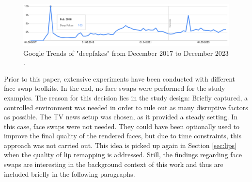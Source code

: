 \documentclass[
  a4paper,  %
  twoside,  %
  bibliography=totoc,
  headsepline,
  cleardoublepage=empty,
  parskip=half,
  draft=false
]{scrbook}
\begin{document}
\begin{figure}[h]
  \centering
  \includegraphics[width=1\textwidth]{./graphics/gtrends_deepfake_1712-2312.png}
  \caption{Google Trends of "deepfakes" from December 2017 to December 2023 \cite{googletrendsGoogleTrendsQuerya}.}
  \label{fig:gtrend-deepfakes}
\end{figure}

Prior to this paper, extensive experiments have been conducted with different face swap toolkits. In the end, no face swaps were performed for the study examples. The reason for this decision lies in the study design: Briefly captured, a controlled environment was needed in order to rule out as many disruptive factors as possible. The TV news setup was chosen, as it provided a steady setting. In this case, face swaps were not needed. They could have been optionally used to improve the final quality of the rendered faces, but due to time constraints, this approach was not carried out. This idea is picked up again in Section \ref{sec:lips} when the quality of lip remapping is addressed.
Still, the findings regarding face swaps are interesting in the background context of this work and thus are included briefly in the following paragraphs.
\end{document}
